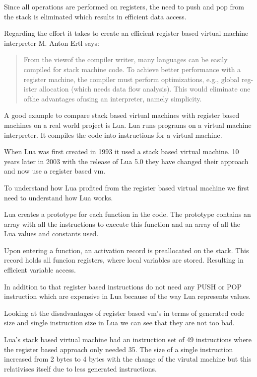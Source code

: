 \documentclass{article}
\begin{document}
Since all operations are performed on registers, the need to push and pop from
the stack is eliminated which results in efficient data access.

Regarding the effort it takes to create an efficient register based virtual
machine interpreter M. Anton Ertl says:

\begin{quotation}
From the viewof the compiler writer, many languages can be easily compiled for
stack machine code. To achieve better performance with a register machine, the
compiler must perform optimizations, e.g., global reg- ister allocation (which
needs data flow analysis). This would eliminate one ofthe advantages ofusing an
interpreter, namely simplicity. ~\cite{stack_caching_for_interpreters}
\end{quotation}

A good example to compare stack based virtual machines with register based
machines on a real world project is Lua. Lua runs programs on a virtual machine
interpreter. It compiles the code into instructions for a virtual machine.

When Lua was first created in 1993 it used a stack based virtual machine. 10
years later in 2003 with the release of Lua 5.0 they have changed their
approach and now use a register based vm. ~\cite{lua_implementation}

To understand how Lua profited from the register based virtual machine we first
need to understand how Lua works.

Lua creates a prototype for each function in the code. The prototype contains an
array with all the instructions to execute this function and an array of all the
Lua values and constants used. ~\cite{lua_implementation}

Upon entering a function, an activation record is preallocated on the stack.
This record holds all funcion registers, where local variables are stored.
Resulting in efficient variable access. ~\cite{lua_implementation}

In addition to that register based instructions do not need any PUSH or POP
instruction which are expensive in Lua because of the way Lua represents
values.

Looking at the disadvantages of register based vm's in terms of generated code
size and single instruction size in Lua we can see that they are not too bad.

Lua's stack based virtual machine had an instruction set of 49 instructions
where the register based approach only needed 35. The size of a single
instruction increased from 2 bytes to 4 bytes with the change of the virutal
machine but this relativises itself due to less generated instructions.
\end{document}
